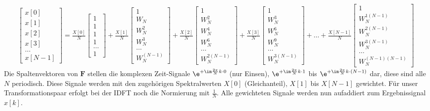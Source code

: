 \begin{align*}
\begin{bmatrix}
x[0]\\[1em]
x[1]\\[1em]
x[2]\\[1em]
x[3]\\[1em]
\dots\\[1em]
x[N-1]
\end{bmatrix}
=
\frac{X[0]}{N}
\begin{bmatrix}
1\\[1em]
1\\[1em]
1\\[1em]
1\\[1em]
\dots\\[1em]
1
\end{bmatrix}
+\frac{X[1]}{N}
\begin{bmatrix}
1\\[1em]
W_N\\[1em]
W_N^2\\[1em]
W_N^3\\[1em]
\dots\\[1em]
W_N^{(N-1)}
\end{bmatrix}
+\frac{X[2]}{N}
\begin{bmatrix}
1\\[1em]
W_N^2\\[1em]
W_N^4\\[1em]
W_N^6\\[1em]
\dots\\[1em]
W_N^{2(N-1)}
\end{bmatrix}
+\frac{X[3]}{N}
\begin{bmatrix}
1\\[1em]
W_N^3\\[1em]
W_N^6\\[1em]
W_N^9\\[1em]
\dots\\[1em]
W_N^{3(N-1)}
\end{bmatrix}
+
\dots
+\frac{X[N-1]}{N}
\begin{bmatrix}
1\\[1em]
W_N^{1(N-1)}\\[1em]
W_N^{2(N-1)}\\[1em]
W_N^{3(N-1)}\\[1em]
\dots\\[1em]
W_N^{(N-1)(N-1)}
\end{bmatrix}
\end{align*}
Die Spaltenvektoren von $\bm{F}$ stellen die komplexen Zeit-Signale
$\e^{+\im\frac{2\pi}{N}k \cdot 0}$ (nur Einsen),
$\e^{+\im\frac{2\pi}{N}k \cdot 1}$ bis $\e^{+\im\frac{2\pi}{N}k \cdot (N-1)}$
dar, diese sind alle $N$ periodisch.
%
Diese Signale werden mit den zugehörigen Spektralwerten
$X[0]$ (Gleichanteil), $X[1]$ bis $X[N-1]$ gewichtet.
Für unser Transformationspaar erfolgt bei der IDFT noch die Normierung mit
$\frac{1}{N}$. Alle gewichteten Signale werden nun aufaddiert zum Ergebnissignal
$x[k]$.

